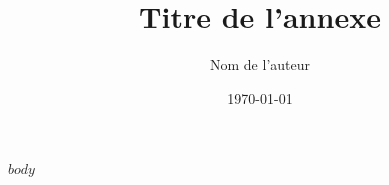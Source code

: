 \documentclass[11pt,a4paper]{article}
\title{Titre de l'annexe}
\author{Nom de l'auteur}
\date{\today}
\begin{document}
\maketitle

\tableofcontents

$body$
\end{document}
